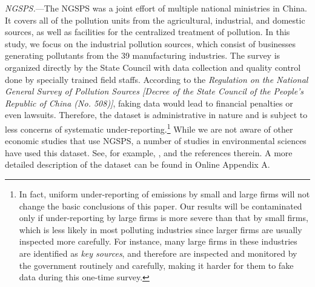 \documentclass[AEJ]{AEA}
\begin{document}
\textit{NGSPS.}---The NGSPS was a joint effort of multiple national ministries in China. %
It covers all of the pollution units from the agricultural, industrial, and domestic sources, as well as facilities for the centralized treatment of pollution. In this study, we focus on the {industrial pollution sources}, which consist of businesses generating pollutants from the 39 manufacturing industries. The survey is organized directly by the State Council with data collection and quality control done by specially trained field staffs. According to the \textit{Regulation on the National General Survey of Pollution Sources [Decree of the State Council of the People's Republic of China (No. 508)]}, faking data would lead to financial penalties or even lawsuits. Therefore, the dataset is administrative in nature and is subject to less concerns of systematic under-reporting.\footnote{In fact, uniform under-reporting of emissions by small and large firms will not change the basic conclusions of this paper. Our results will be contaminated only if under-reporting by large firms is more severe than that by small firms, which is less likely in most polluting industries since larger firms are usually inspected more carefully. For instance, many large firms in these industries are identified as \textit{key sources}, and therefore are inspected and monitored by the government routinely and carefully, making it harder for them to fake data during this one-time survey.} While we are not aware of other economic studies that use NGSPS, a number of studies in environmental sciences have used this dataset. See, for example, \citet{Niuetal:2016}, \citet{Qietal:2017} and the references therein. A more detailed description of the dataset can be found in Online Appendix A. %
\end{document}
